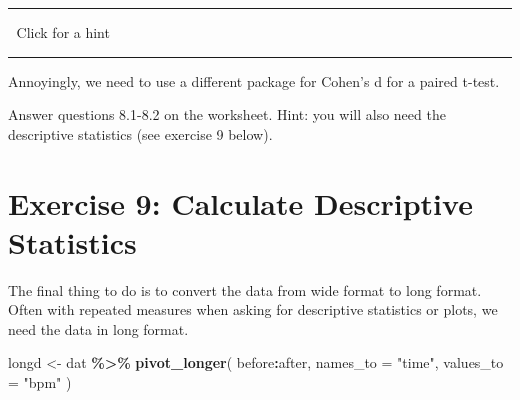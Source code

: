 \documentclass[
]{book}
\newenvironment{Shaded}{\begin{snugshade}}{\end{snugshade}}
\newcommand{\AttributeTok}[1]{\textcolor[rgb]{0.13,0.29,0.53}{#1}}
\newcommand{\CommentTok}[1]{\textcolor[rgb]{0.56,0.35,0.01}{\textit{#1}}}
\newcommand{\ConstantTok}[1]{\textcolor[rgb]{0.56,0.35,0.01}{#1}}
\newcommand{\FunctionTok}[1]{\textcolor[rgb]{0.13,0.29,0.53}{\textbf{#1}}}
\newcommand{\NormalTok}[1]{#1}
\newcommand{\OtherTok}[1]{\textcolor[rgb]{0.56,0.35,0.01}{#1}}
\newcommand{\SpecialCharTok}[1]{\textcolor[rgb]{0.81,0.36,0.00}{\textbf{#1}}}
\newcommand{\StringTok}[1]{\textcolor[rgb]{0.31,0.60,0.02}{#1}}
\let\oldsection\section
\renewcommand{\section}{\needspace{5\baselineskip}\oldsection}
\begin{document}
\begin{center}\rule{0.5\linewidth}{0.5pt}\end{center}

👀 Click for a hint

\begin{Shaded}
\end{Shaded}

\begin{center}\rule{0.5\linewidth}{0.5pt}\end{center}

Annoyingly, we need to use a different package for Cohen's d for a paired t-test.

\begin{Shaded}
\end{Shaded}

Answer questions 8.1-8.2 on the worksheet. Hint: you will also need the descriptive statistics (see exercise 9 below).

\section{Exercise 9: Calculate Descriptive Statistics}\label{exercise-9-calculate-descriptive-statistics}

The final thing to do is to convert the data from wide format to long format. Often with repeated measures when asking for descriptive statistics or plots, we need the data in long format.

\begin{Shaded}
\begin{Highlighting}[]
\NormalTok{longd }\OtherTok{\textless{}{-}}\NormalTok{ dat }\SpecialCharTok{\%\textgreater{}\%}
  \FunctionTok{pivot\_longer}\NormalTok{(}
\NormalTok{              before}\SpecialCharTok{:}\NormalTok{after,}
              \AttributeTok{names\_to =} \StringTok{"time"}\NormalTok{,}
              \AttributeTok{values\_to =} \StringTok{"bpm"}
\NormalTok{              )}
\end{Highlighting}
\end{Shaded}
\end{document}
